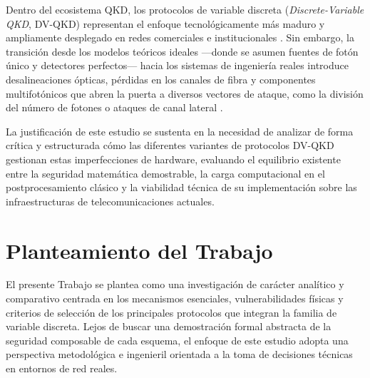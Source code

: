 Dentro del ecosistema QKD, los protocolos de variable discreta (\emph{Discrete-Variable QKD}, DV-QKD) representan el enfoque tecnológicamente más maduro y ampliamente desplegado en redes comerciales e institucionales \citep{scarani2009, lo2014}. Sin embargo, la transición desde los modelos teóricos ideales —donde se asumen fuentes de fotón único y detectores perfectos— hacia los sistemas de ingeniería reales introduce desalineaciones ópticas, pérdidas en los canales de fibra y componentes multifotónicos que abren la puerta a diversos vectores de ataque, como la división del número de fotones o ataques de canal lateral \citep{brassard2000pns, lydersen2010}. 

La justificación de este estudio se sustenta en la necesidad de analizar de forma crítica y estructurada cómo las diferentes variantes de protocolos DV-QKD gestionan estas imperfecciones de hardware, evaluando el equilibrio existente entre la seguridad matemática demostrable, la carga computacional en el postprocesamiento clásico y la viabilidad técnica de su implementación sobre las infraestructuras de telecomunicaciones actuales.

\section{Planteamiento del Trabajo}

El presente Trabajo se plantea como una investigación de carácter analítico y comparativo centrada en los mecanismos esenciales, vulnerabilidades físicas y criterios de selección de los principales protocolos que integran la familia de variable discreta. Lejos de buscar una demostración formal abstracta de la seguridad composable de cada esquema, el enfoque de este estudio adopta una perspectiva metodológica e ingenieril orientada a la toma de decisiones técnicas en entornos de red reales.

